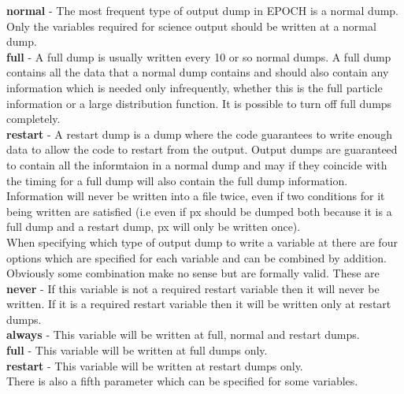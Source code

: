 \documentclass[12pt]{article}
\newcommand{\emphtext}{\color{warwickdark} \fontfamily{phv}\selectfont\Large\bf}
\newcommand{\EPOCH}{{\color{warwickdark}\fontfamily{phv}\selectfont EPOCH} }
\begin{document}
{\emphtext normal} - The most frequent type of output dump in \EPOCH is a
normal dump. Only the variables required for science output should be written
at a normal dump.\\

{\emphtext full} - A full dump is usually written every 10 or so normal
dumps. A full dump contains all the data that a normal dump contains and should
also contain any information which is needed only infrequently, whether this is
the full particle information or a large distribution function. It is possible
to turn off full dumps completely.\\

{\emphtext restart} - A restart dump is a dump where the code guarantees to
write enough data to allow the code to restart from the output. Output dumps
are guaranteed to contain all the informtaion in a normal dump and may if they
coincide with the timing for a full dump will also contain the full dump
information.\\

Information will never be written into a file twice, even if two conditions for
it being written are satisfied (i.e even if px should be dumped both because it
is a full dump and a restart dump, px will only be written once).\\

When specifying which type of output dump to write a variable at there are four
options which are specified for each variable and can be combined by
addition. Obviously some combination make no sense but are formally
valid. These are\\

{\emphtext never} - If this variable is not a required restart variable then it
will never be written. If it is a required restart variable then it will be
written only at restart dumps.\\

{\emphtext always} - This variable will be written at full, normal and restart
dumps.\\

{\emphtext full} - This variable will be written at full dumps only.\\

{\emphtext restart} - This variable will be written at restart dumps only.\\

There is also a fifth parameter which can be specified for some variables.\\
\end{document}
